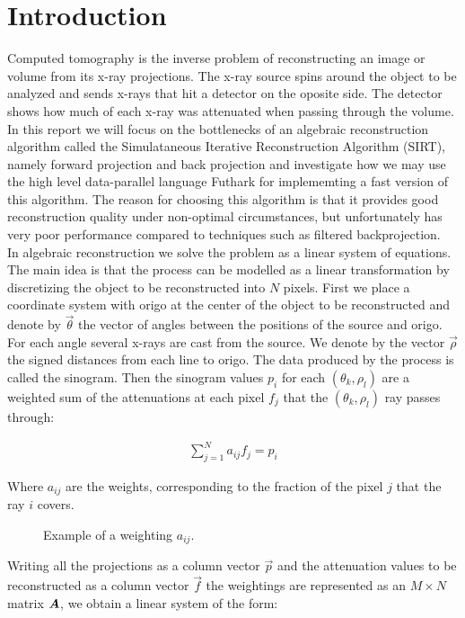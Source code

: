 \section{Introduction}
Computed tomography is the inverse problem of reconstructing an image or volume from its x-ray projections. The x-ray source spins around the object to be analyzed and sends x-rays that hit a detector on the oposite side. The detector shows how much of each x-ray was attenuated when passing through the volume. In this report we will focus on the bottlenecks of an algebraic reconstruction algorithm called the Simulataneous Iterative Reconstruction Algorithm (SIRT), namely forward projection and back projection and investigate how we may use the high level data-parallel language Futhark for implememting a fast version of this algorithm. The reason for choosing this algorithm is that it provides good reconstruction quality under non-optimal circumstances, but unfortunately has very poor performance compared to techniques such as filtered backprojection.\\
In algebraic reconstruction we solve the problem as a linear system of equations. The main idea is that the process can be modelled as a linear transformation by discretizing the object to be reconstructed into $N$ pixels. First we place a coordinate system with origo at the center of the object to be reconstructed and denote by $\vec{\theta}$ the vector of angles between the positions of the source and origo. For each angle several x-rays are cast from the source. We denote by the vector $\vec{\rho}$ the signed distances from each line to origo. The data produced by the process is called the sinogram. Then the sinogram values $p_i$ for each $(\theta_k,\rho_l)$  are a weighted sum of the attenuations at each pixel $f_j$ that the $(\theta_k,\rho_l)$ ray passes through:

\begin{align}
\sum_{j=1}^N a_{ij}f_j=p_i
\end{align}

Where $a_{ij}$ are the weights, corresponding to the fraction of the pixel $j$ that the ray $i$ covers.

\begin{figure}
\centering
{}
\caption{Example of a weighting $a_{ij}$.}
\label{fig:weightings}
\end{figure}
Writing all the projections as a column vector $\vec{p}$ and the attenuation values to be reconstructed as a column vector $\vec{f}$ the weightings are represented as an $M\times N$ matrix $\mat{A}$, we obtain a linear system of the form:

